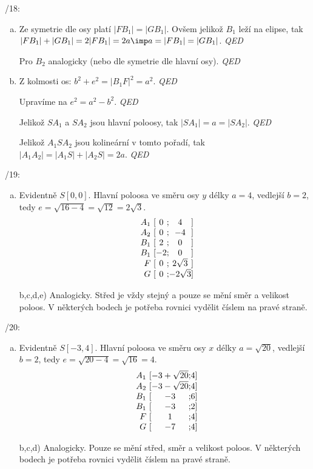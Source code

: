 
\BeginDoc{}
/18:
\begin{enumerate}[a)]
	\item Ze symetrie dle osy platí $|FB_1| = |GB_1|$.
		Ovšem jelikož $B_1$ leží na elipse, tak $|FB_1| + |GB_1| = 2|FB_1| =2a \imp a = |FB_1| = |GB_1|$. \emph{QED}

		Pro $B_2$ analogicky (nebo dle symetrie dle hlavní osy). \emph{QED}

	\item Z kolmosti os: $b^2 + e^2 = |B_1F|^2 = a^2$. \emph{QED}

		Upravíme na $e^2= a^2 - b^2$. \emph{QED}

		Jelikož $SA_1$ a $SA_2$ jsou hlavní poloosy, tak $|SA_1|=a=|SA_2|$. \emph{QED}

		Jelikož $A_1SA_2$ jsou kolineární v tomto pořadí, tak $|A_1A_2| = |A_1S| + |A_2S| = 2a$. \emph{QED}

\end{enumerate}
/19:
\begin{enumerate}[a)]
	\item
		Evidentně $S[0,0]$.
		Hlavní poloosa ve směru osy $y$ délky $a = 4$, vedlejší $b = 2$, tedy $e = \sqrt{16 - 4} = \sqrt{12}  =  2 \sqrt 3$.
$$
\begin{array}{r@{\ [}c@{;}c@{]}}
	A_1 &  0 & 4\\
	A_2 &  0 & -4\\
	B_1 &  2 & 0 \\
	B_1 & -2 & 0 \\
	F   &  0 & 2\sqrt 3\\
	G   &  0 & -2\sqrt 3\\
\end{array}
$$
\item [b,c,d,e)] Analogicky. Střed je vždy stejný a pouze se mění směr a velikost poloos.
	V některých bodech je potřeba rovnici vydělit číslem na pravé straně.
\end{enumerate}

/20:
\begin{enumerate}[a)]
	\item
		Evidentně $S[-3,4]$.
		Hlavní poloosa ve směru osy $x$ délky $a = \sqrt{20}$, vedlejší $b = 2$, tedy $e = \sqrt{20 - 4} = \sqrt{16}  =  4$.
$$
\begin{array}{r@{\ [}c@{;}c@{]}}
	A_1 &  -3+\sqrt{20} & 4\\
	A_2 &  -3-\sqrt{20} & 4\\
	B_1 &  -3 & 6 \\
	B_1 &  -3 & 2 \\
	F   &  1 & 4\\
	G   &  -7 & 4\\
\end{array}
$$
\item [b,c,d)] Analogicky. Pouze se mění střed, směr a velikost poloos. 
	V některých bodech je potřeba rovnici vydělit číslem na pravé straně.
\end{enumerate}

